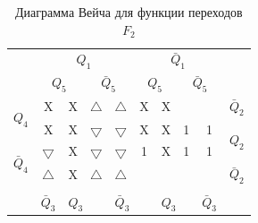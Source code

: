 \documentclass[a4paper,14pt]{article}
\begin{document}

\begin{table}[H]
	\begin{center}
		\caption{\label{tab:F2_tab} Диаграмма Вейча для функции переходов $F_2$ }
		\begin{tabular}{cccccccccc}
			& \multicolumn{4}{c}{$Q_1$} & \multicolumn{4}{c}{$\bar{Q}_1$} &  \\
			& \multicolumn{2}{c}{$Q_5$} & \multicolumn{2}{c}{$\bar{Q}_5$} & \multicolumn{2}{c}{$Q_5$} & \multicolumn{2}{c}{$\bar{Q}_5$} &  \\ \cline{2-9}
			\multicolumn{1}{c|}{\multirow{2}{*}{$Q_4$}} & \multicolumn{1}{c|}{X} & \multicolumn{1}{c|}{X} & \multicolumn{1}{c|}{$\bigtriangleup$} & \multicolumn{1}{c|}{$\bigtriangleup$} & \multicolumn{1}{c|}{X} & \multicolumn{1}{c|}{X} & \multicolumn{1}{c|}{} & \multicolumn{1}{c|}{} & $\bar{Q}_2$ \\ \cline{2-9}
			\multicolumn{1}{c|}{} & \multicolumn{1}{c|}{X} & \multicolumn{1}{c|}{X} & \multicolumn{1}{c|}{$\bigtriangledown$} & \multicolumn{1}{c|}{$\bigtriangledown$} & \multicolumn{1}{c|}{X} & \multicolumn{1}{c|}{X} & \multicolumn{1}{c|}{1} & \multicolumn{1}{c|}{1} & \multirow{2}{*}{$Q_2$} \\ \cline{2-9}
			\multicolumn{1}{c|}{\multirow{2}{*}{$\bar{Q}_4$}} & \multicolumn{1}{c|}{$\bigtriangledown$} & \multicolumn{1}{c|}{X} & \multicolumn{1}{c|}{$\bigtriangledown$} & \multicolumn{1}{c|}{$\bigtriangledown$} & \multicolumn{1}{c|}{1} & \multicolumn{1}{c|}{X} & \multicolumn{1}{c|}{1} & \multicolumn{1}{c|}{1} &  \\ \cline{2-9}
			\multicolumn{1}{c|}{} & \multicolumn{1}{c|}{$\bigtriangleup$} & \multicolumn{1}{c|}{X} & \multicolumn{1}{c|}{$\bigtriangleup$} & \multicolumn{1}{c|}{$\bigtriangleup$} & \multicolumn{1}{c|}{} & \multicolumn{1}{c|}{} & \multicolumn{1}{c|}{} & \multicolumn{1}{c|}{} & $\bar{Q}_2$ \\ \cline{2-9}
			&  & \multicolumn{2}{c}{} & \multicolumn{2}{c}{} & \multicolumn{2}{c}{} &  &  \\
			\multicolumn{1}{l}{} & \multicolumn{1}{l}{$\bar{Q}_3$} & \multicolumn{2}{l}{$Q_3$} & \multicolumn{2}{l}{$\bar{Q}_3$} & \multicolumn{2}{l}{$Q_3$} & \multicolumn{1}{l}{$\bar{Q}_3$} & \multicolumn{1}{l}{}
		\end{tabular}
	\end{center}
\end{table}

\end{document}
